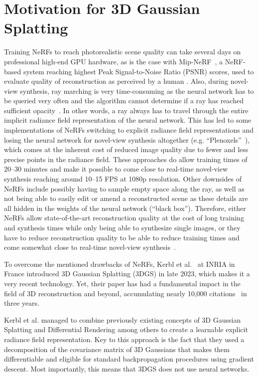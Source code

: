 \section{Motivation for 3D Gaussian Splatting}
Training NeRFs to reach photorealistic scene quality can take several days on professional high-end GPU hardware, as is the case with Mip-NeRF~\cite{barronMipNeRFMultiscaleRepresentation2021}, a NeRF-based system reaching highest Peak Signal-to-Noise Ratio (PSNR) scores, used to evaluate quality of reconstruction as perceived by a human \cite{kerbl3DGaussianSplatting2023,barronMipNeRFMultiscaleRepresentation2021}.
Also, during novel-view synthesis, ray marching is very time-consuming as the neural network has to be queried very often and the algorithm cannot determine if a ray has reached sufficient opacity~\cite{kerbl3DGaussianSplatting2023}. In other words, a ray always has to travel through the entire implicit radiance field representation of the neural network.
This has led to some implementations of NeRFs switching to explicit radiance field representations and losing the neural network for novel-view synthesis altogether (e.g. ``Plenoxels''~\cite{fridovich-keilPlenoxelsRadianceFields2022}), which comes at the inherent cost of reduced image quality due to fewer and less precise points in the radiance field.
These approaches do allow training times of 20--30 minutes and make it possible to come close to real-time novel-view synthesis reaching around 10--15 FPS at 1080p resolution. 
Other downsides of NeRFs include possibly having to sample empty space along the ray, as well as not being able to easily edit or amend a reconstructed scene as these details are all hidden in the weights of the neural network (``black box''). 
Therefore, either NeRFs allow state-of-the-art reconstruction quality at the cost of long training and synthesis times while only being able to synthesize single images, or they have to reduce reconstruction quality to be able to reduce training times and come somewhat close to real-time novel-view synthesis~\cite{kerbl3DGaussianSplatting2023}.

To overcome the mentioned drawbacks of NeRFs, Kerbl et al.~\cite{kerbl3DGaussianSplatting2023} at INRIA in France introduced 3D Gaussian Splatting (3DGS) in late 2023, which makes it a very recent technology. Yet, their paper has had a fundamental impact in the field of 3D reconstruction and beyond, accumulating nearly 10,000 citations~\cite{semanticScholarKerbl,researchGateKerbl} in three years. 

Kerbl et al. managed to combine previously existing concepts of 3D Gaussian Splatting and Differential Rendering among others to create a learnable explicit radiance field representation. Key to this approach is the fact that they used a decomposition of the covariance matrix of 3D Gaussians that makes them differentiable and eligible for standard backpropagation procedures using gradient descent. Most importantly, this means that 3DGS does not use neural networks.


